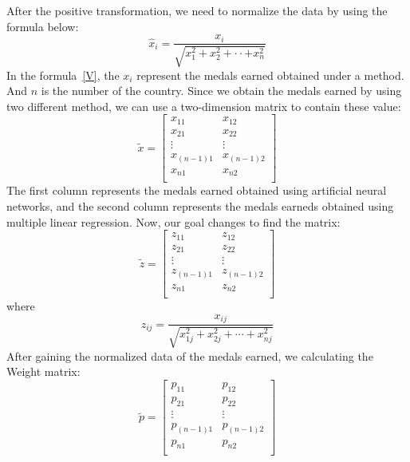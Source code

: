 \documentclass{mcmthesis}
\begin{document}
After the positive transformation, we need to normalize the data by using the formula below:\\
\begin{equation}\label{V}
\hat{x}_i=\frac{x_i}{\sqrt{x_{1}^{2}+x_{2}^{2}+\cdot \cdot +x_{n}^{2}}}
\end{equation}
In the formula~\eqref{V}, the $x_i$ represent the medals earned obtained under a method. And $n$ is the number of the country. Since we obtain the medals earned by using two different method, we can use a two-dimension matrix to contain these value:\\
\begin{equation}\label{eq:3}
\tilde{x}=
\begin{bmatrix}
	x_{11}&		x_{12}\\
	x_{21}&		x_{22}\\
	\vdots&		\vdots\\
	x_{(n-1)1}&		x_{(n-1)2}\\
	x_{n1}&		x_{n2}\\
\end{bmatrix}
\end{equation}
The first column represents the medals earned obtained using artificial neural networks, and the second column represents the medals earneds obtained using multiple linear regression.
Now, our goal changes to find the matrix:
\begin{equation}\label{eq:3}
\tilde{z}=
\begin{bmatrix}
	z_{11}&		z_{12}\\
	z_{21}&		z_{22}\\
	\vdots&		\vdots\\
	z_{\left( n-1 \right) 1}&		z_{\left( n-1 \right) 2}\\
	z_{n1}&		z_{n2}\\
\end{bmatrix}
\end{equation}
where
\begin{equation}\label{eq:1}
z_{ij}=\frac{x_{ij}}{\sqrt{x_{1j}^{2}+x_{2j}^{2}+\cdots+x_{nj}^{2}}}
\end{equation}
After gaining the normalized data of the medals earned, we calculating the Weight matrix:
\begin{equation}\label{eq:3}
\tilde{p}= 
\begin{bmatrix}
	p_{11}&		p_{12}\\
	p_{21}&		p_{22}\\
	\vdots&		\vdots\\
	p_{(n-1) 1}&		p_{\left( n-1 \right) 2}\\
	p_{n1}&		p_{n2}\\
\end{bmatrix}
\end{equation}
\end{document}
